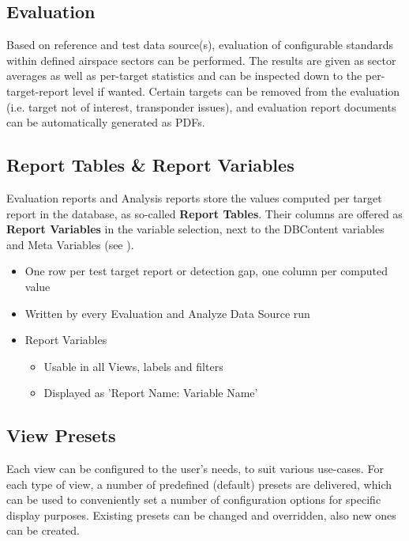 \subsection*{Evaluation}

Based on reference and test data source(s), evaluation of configurable standards within defined airspace sectors can be performed. The results are given as sector averages as well as per-target statistics and can be inspected down to the per-target-report level if wanted. Certain targets can be removed from the evaluation (i.e. target not of interest, transponder issues), and evaluation report documents can be automatically generated as PDFs.

\subsection*{Report Tables \& Report Variables}

Evaluation reports and Analysis reports store the values computed per target report in the database, as so-called \textbf{Report Tables}. 
Their columns are offered as \textbf{Report Variables} in the variable selection, next to the DBContent variables and Meta Variables (see ). \\

\begin{itemize}
\item One row per test target report or detection gap, one column per computed value
\item Written by every Evaluation and Analyze Data Source run
\item Report Variables
\begin{itemize}
\item Usable in all Views, labels and filters
\item Displayed as 'Report Name: Variable Name'
\end{itemize}
\end{itemize}

\subsection*{View Presets}

Each view can be configured to the user's needs, to suit various use-cases. For each type of view, a number of predefined (default) presets are delivered, which can be used to conveniently set a number of configuration options for specific display purposes. Existing presets can be changed and overridden, also new ones can be created.

